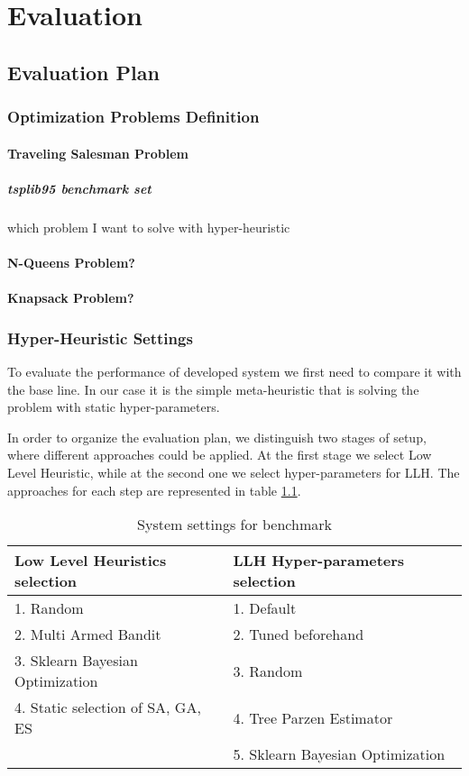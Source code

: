 \chapter{Evaluation}


\section{Evaluation Plan}

\subsection{Optimization Problems Definition}
\subsubsection{Traveling Salesman Problem}
\paragraph{tsplib95 benchmark set}
which problem I want to solve with hyper-heuristic
\subsubsection{N-Queens Problem?}
\subsubsection{Knapsack Problem?}

\subsection{Hyper-Heuristic Settings}
To evaluate the performance of developed system we first need to compare it with the base line. In our case it is the simple meta-heuristic that is solving the problem with static hyper-parameters.

In order to organize the evaluation plan, we distinguish two stages of setup, where different approaches could be applied. 
At the first stage we select Low Level Heuristic, while at the second one we select hyper-parameters for LLH.
The approaches for each step are represented in table \ref{evaluation: settings table}.

\begin{table}[h!]
	\centering
	\begin{tabular}{|l|l|}
		\hline
		\textbf{Low Level Heuristics selection} & \textbf{LLH Hyper-parameters selection} \\
		\hline
		1. Random & 1. Default \\
		2. Multi Armed Bandit & 2. Tuned beforehand \\
		3. Sklearn Bayesian Optimization & 3. Random \\
		4. Static selection of SA, GA, ES & 4. Tree Parzen Estimator \\
		& 5. Sklearn Bayesian Optimization\\
		\hline
	\end{tabular}
	
	\caption{System settings for benchmark}
	\label{evaluation: settings table}
\end{table}


